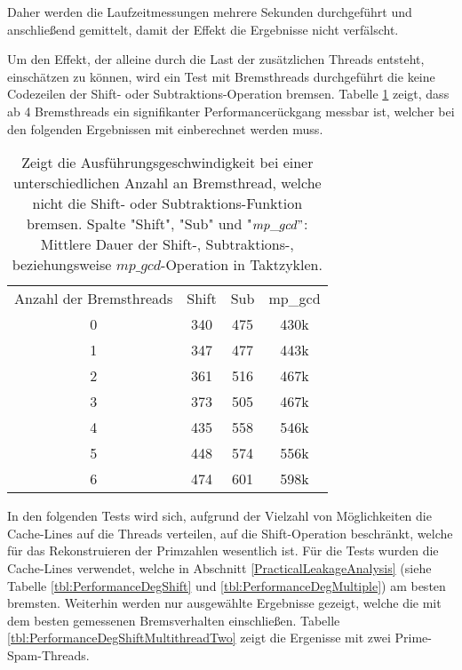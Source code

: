 Daher werden die Laufzeitmessungen mehrere Sekunden durchgeführt und anschließend gemittelt, damit der Effekt die Ergebnisse nicht verfälscht.

Um den Effekt, der alleine durch die Last der zusätzlichen Threads entsteht, einschätzen zu können, wird ein Test mit Bremsthreads durchgeführt die keine Codezeilen der Shift- oder Subtraktions-Operation bremsen.
Tabelle \ref{tbl:PrimeSpamMultithreadRef} zeigt, dass ab 4 Bremsthreads ein signifikanter Performancerückgang messbar ist, welcher bei den folgenden Ergebnissen mit einberechnet werden muss.

\begin{table}[h]
\caption{Zeigt die Ausführungsgeschwindigkeit bei einer unterschiedlichen Anzahl an Bremsthread, welche nicht die Shift- oder Subtraktions-Funktion bremsen. Spalte "Shift", "Sub" und "$mp\_gcd"$: Mittlere Dauer der Shift-, Subtraktions-, beziehungsweise $mp\_gcd$-Operation in Taktzyklen.}
\label{tbl:PrimeSpamMultithreadRef}
\begin{tabular}{cccc}
Anzahl der Bremsthreads & Shift & Sub & mp\_gcd \\
0                      & 340   & 475 & 430k    \\
1                      & 347   & 477 & 443k    \\
2                      & 361   & 516 & 467k    \\
3                      & 373   & 505 & 467k    \\
4                      & 435   & 558 & 546k    \\
5                      & 448   & 574 & 556k    \\
6                      & 474   & 601 & 598k   
\end{tabular}
\end{table}

In den folgenden Tests wird sich, aufgrund der Vielzahl von Möglichkeiten die Cache-Lines auf die Threads verteilen, auf die Shift-Operation beschränkt, welche für das Rekonstruieren der Primzahlen wesentlich ist.
Für die Tests wurden die Cache-Lines verwendet, welche in Abschnitt \ref{PracticalLeakageAnalysis} (siehe Tabelle \ref{tbl:PerformanceDegShift} und \ref{tbl:PerformanceDegMultiple}) am besten bremsten.
Weiterhin werden nur ausgewählte Ergebnisse gezeigt, welche die mit dem besten gemessenen Bremsverhalten einschließen.
Tabelle \ref{tbl:PerformanceDegShiftMultithreadTwo} zeigt die Ergenisse mit zwei Prime-Spam-Threads.

